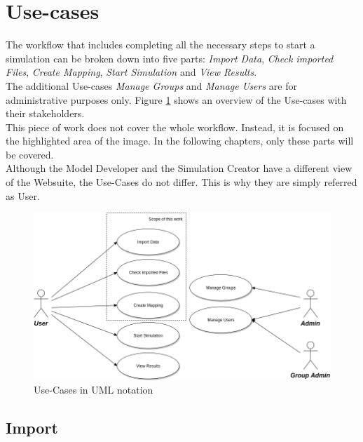 \section{Use-cases}
The workflow that includes completing all the necessary steps to start a simulation can be broken down into five parts: \textit{Import Data}, \textit{Check imported Files}, \textit{Create Mapping}, \textit{Start Simulation} and \textit{View Results}.\\
The additional Use-cases \textit{Manage Groups} and \textit{Manage Users} are for administrative purposes only. Figure \ref{fig:use-cases} shows an overview of the Use-cases with their stakeholders.\\
This piece of work does not cover the whole workflow. Instead, it is focused on the highlighted area of the image. In the following chapters, only these parts will be covered.\\
Although the Model Developer and the Simulation Creator have a different view of the Websuite, the Use-Cases do not differ. This is why they are simply referred as User.
\begin{figure}[H]
	\centering\includegraphics[width=1\textwidth]{res/Use-Cases_reduced}
	\caption{Use-Cases in UML notation}
	\label{fig:use-cases}
\end{figure}

\subsection{Import}
\begin{usecase}
\end{usecase}

